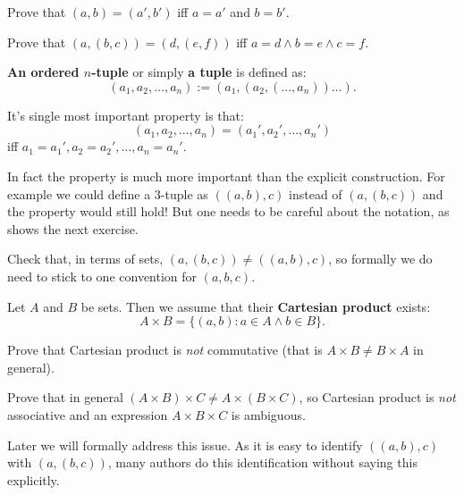 \begin{exercise}
  Prove that $(a,b)=(a',b')$ iff $a=a'$ and $b=b'$.
\end{exercise}

\begin{exercise}
  Prove that $(a,(b,c))=(d,(e,f))$ iff $a=d\wedge b=e\wedge c=f$.
\end{exercise}

\begin{definition}
  \textbf{An ordered $n$-tuple} or simply \textbf{a tuple} is defined as:
  $$(a_1,a_2,\dots, a_n) := (a_1, (a_2, (..., a_n)) \dots ).$$

  It's single most important property is that:
  $$(a_1,a_2,\dots,a_n)=(a_1', a_2', \dots, a_n')$$ iff $a_1=a_1', a_2=a_2', \dots, a_n=a_n'.$
\end{definition}

In fact the property is much more important than the explicit construction. For example we could define a 3-tuple as $((a,b),c)$ instead of $(a, (b,c))$ and
the property would still hold! But one needs to be careful about the notation, as shows the next exercise.

\begin{exercise}
  Check that, in terms of sets, $(a,(b,c))\neq ((a,b),c)$, so formally we do need to stick to one convention for $(a,b,c)$.
\end{exercise}

\begin{definition}
  Let $A$ and $B$ be sets. Then we assume that their
  \textbf{Cartesian product} exists:
  $$A\times B = \{(a,b) : a\in A\wedge b\in B\}.$$
\end{definition}

\begin{exercise}
  Prove that Cartesian product is \textit{not} commutative (that is $A\times B\neq B\times A$ in general).
\end{exercise}

\begin{exercise}
  Prove that in general $(A\times B)\times C\neq A\times (B\times C)$, so Cartesian product is \textit{not} associative and an expression $A\times B\times C$ is ambiguous.
\end{exercise}

Later we will formally address this issue. As it is easy to identify $((a, b), c)$ with $(a,(b,c))$, many authors do this identification without saying this explicitly.

